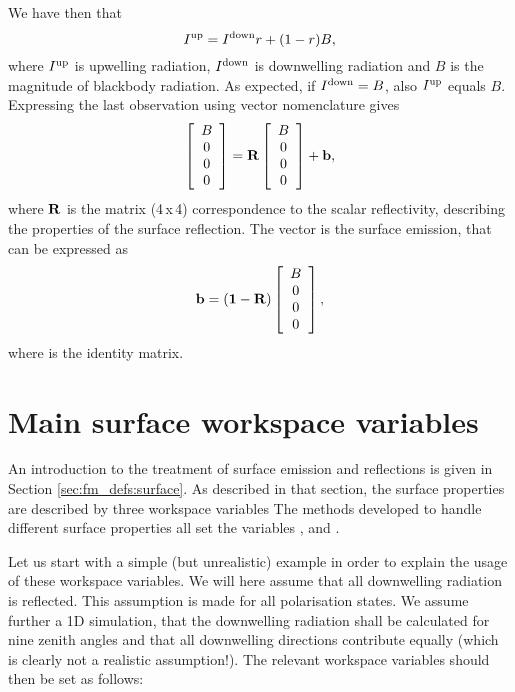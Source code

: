  We have then that
 \begin{equation}
  I^\mathrm{up} = I^\mathrm{down}r + (1-r)B,
 \end{equation}
 where $I^\mathrm{up}$ is upwelling radiation, $I^\mathrm{down}$
 is downwelling radiation and $B$ is the magnitude of blackbody
 radiation. As expected, if $I^\mathrm{down}=B$, also
 $I^\mathrm{up}$ equals $B$.  Expressing the last observation using
 vector nomenclature gives
 \begin{equation}
   \left[\begin{array}{c} B \\ 0 \\0\\0 \end{array}\right] =
  \mathbf{R} \left[\begin{array}{c} B \\ 0 \\0\\0 \end{array}\right] + 
  \mathbf{b},
 \end{equation}
 where $\mathbf{R}$ is the matrix (4\,x\,4) correspondence to the
 scalar reflectivity, describing the properties of the surface
 reflection. The vector  is the surface emission, that
 can be expressed as
 \begin{equation}
  \label{eq:surface:bvector} 
  \mathbf{b} = (\mathbf{1}-\mathbf{R})
      \left[\begin{array}{c} B \\ 0 \\0\\0 \end{array}\right],
 \end{equation}
 where  is the identity matrix. 



\section{Main surface workspace variables}
\label{sec:surface:surface:wsvs}
An introduction to the treatment of surface emission and reflections is given
in Section \ref{sec:fm_defs:surface}. As described in that section, the surface
properties are described by three workspace variables The methods developed to
handle different surface properties all set the variables
,  and
.

Let us start with a simple (but unrealistic) example in order to explain the
usage of these workspace variables. We will here assume that all downwelling
radiation is reflected. This assumption is made for all polarisation states. We
assume further a 1D simulation, that the downwelling radiation shall be
calculated for nine zenith angles and that all downwelling directions
contribute equally (which is clearly not a realistic assumption!). The relevant
workspace variables should then be set as follows:
 
